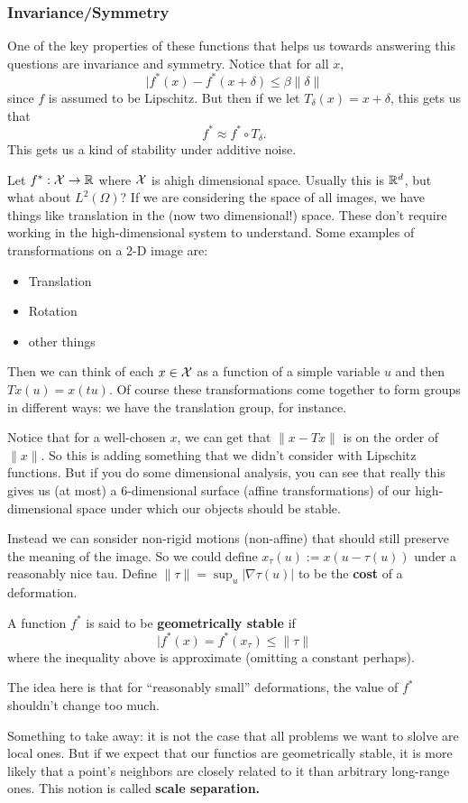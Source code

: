 \documentclass[12pt]{article}
\begin{document}
\subsubsection{Invariance/Symmetry}
One of the key properties of these functions that helps us towards answering this questions are invariance and symmetry. Notice that for all $x$,
\[|f^\ast(x)-f^\ast(x+\delta)\le\beta\|\delta\|\]
since $f$ is assumed to be Lipschitz. But then if we let $T_\delta(x)=x+\delta$, this gets us that 
\[f^\ast\approx f^\ast\circ T_\delta.\]
This gets us a kind of stability under additive noise. 

Let $f^\ast:\mathcal{X}\to\mathbb{R}$ where $\mathcal{X}$ is ahigh dimensional space. Usually this is $\mathbb{R}^d$, but what about $L^2(\Omega)$? If we are considering the space of all images, we have things like translation in the (now two dimensional!) space. These don't require working in the high-dimensional system to understand.
Some examples of transformations on a 2-D image are:
\begin{itemize}
	\item Translation
	\item Rotation
	\item other things
\end{itemize}
Then we can think of each $x\in\mathcal{X}$ as a function of a simple variable $u$ and then $Tx(u)=x(tu).$ Of course these transformations come together to form groups in different ways:
we have the translation group, for instance.

Notice that for a well-chosen $x$, we can get that $\|x-Tx\|$ is on the order of $\|x\|$. So this is adding something that we didn't consider with Lipschitz functions. But if you do some dimensional analysis, you can see 
that really this gives us (at most) a 6-dimensional surface (affine transformations) of our high-dimensional space under which our objects should be stable. 

Instead we can sonsider non-rigid motions (non-affine) that should still preserve the meaning of the image. So we could define $x_\tau(u):=x(u-\tau(u))$
under a reasonably nice tau. Define $\|\tau\|=\sup_u|\nabla\tau(u)|$ to be the \textbf{cost} of a deformation.
\begin{defn}
	A function $f^\ast$ is said to be \textbf{geometrically stable} if 
	\[|f^\ast(x)=f^\ast(x_\tau)\le \|\tau\|\]
	where the inequality above is approximate (omitting a constant perhaps).
\end{defn}
\begin{rmk}
	The idea here is that for ``reasonably small'' deformations, the value of $f^\ast$ shouldn't change too much.
\end{rmk}
Something to take away: it is not the case that all problems we want to slolve are local ones. But if we expect that our functios are geometrically stable, it is more likely that a point's neighbors are closely related to it than arbitrary long-range ones.
This notion is called \textbf{scale separation.} 
\end{document}
